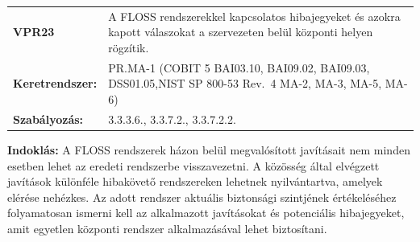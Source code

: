\documentclass[12pt,magyar,a4paper,oneside]{scrreprt}
\begin{document}
\begin{longtable}[]{@{}ll@{}}
\toprule
\endhead
\begin{minipage}[t]{0.16\columnwidth}\raggedright
\textbf{VPR23}\strut
\end{minipage} & \begin{minipage}[t]{0.79\columnwidth}\raggedright
A FLOSS rendszerekkel kapcsolatos hibajegyeket és azokra kapott
válaszokat a szervezeten belül központi helyen rögzítik.\strut
\end{minipage}\tabularnewline
\begin{minipage}[t]{0.16\columnwidth}\raggedright
\textbf{Keretrendszer:}\strut
\end{minipage} & \begin{minipage}[t]{0.79\columnwidth}\raggedright
PR.MA-1 (COBIT 5 BAI03.10, BAI09.02, BAI09.03, DSS01.05,NIST SP 800-53
Rev.~4 MA-2, MA-3, MA-5, MA-6)\strut
\end{minipage}\tabularnewline
\begin{minipage}[t]{0.16\columnwidth}\raggedright
\textbf{Szabályozás:}\strut
\end{minipage} & \begin{minipage}[t]{0.79\columnwidth}\raggedright
3.3.3.6., 3.3.7.2., 3.3.7.2.2.\strut
\end{minipage}\tabularnewline
\bottomrule
\end{longtable}

\textbf{Indoklás: } A FLOSS rendszerek házon belül megvalósított
javításait nem minden esetben lehet az eredeti rendszerbe visszavezetni.
A közösség által elvégzett javítások különféle hibakövető rendszereken
lehetnek nyilvántartva, amelyek elérése nehézkes. Az adott rendszer
aktuális biztonsági szintjének értékeléséhez folyamatosan ismerni kell
az alkalmazott javításokat és potenciális hibajegyeket, amit egyetlen
központi rendszer alkalmazásával lehet biztosítani.
\end{document}

